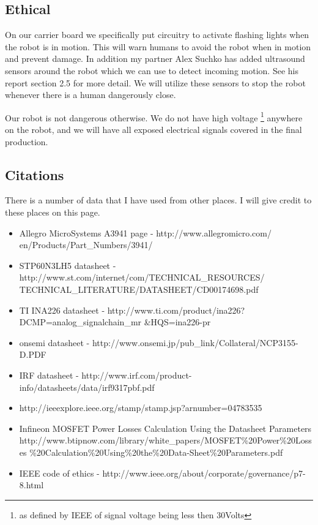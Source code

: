\documentclass[12pt]{article}
\begin{document}
\subsection{Ethical}
On our carrier board we specifically put circuitry to activate flashing lights when the robot is in motion. This will warn humans to avoid the robot when in motion and prevent damage. In addition my partner Alex Suchko has added ultrasound sensors around the robot which we can use to detect incoming motion. See his report section 2.5 for more detail. We will utilize these sensors to stop the robot whenever there is a human dangerously close.

Our robot is not dangerous otherwise. We do not have high voltage \footnote{as defined by IEEE of signal voltage being less then 30Volts} anywhere on the robot, and we will have all exposed electrical signals covered in the final production.
\subsection{Citations}
There is a number of data that I have used from other places. I will give credit to these places on this page.
\begin{itemize}
\item Allegro MicroSystems A3941 page - http://www.allegromicro.com/ en/Products/Part\_Numbers/3941/
\item STP60N3LH5 datasheet - http://www.st.com/internet/com/TECHNICAL\_RESOURCES/ TECHNICAL\_LITERATURE/DATASHEET/CD00174698.pdf
\item TI INA226 datasheet - http://www.ti.com/product/ina226?DCMP=analog\_signalchain\_mr \&HQS=ina226-pr
\item onsemi datasheet - http://www.onsemi.jp/pub\_link/Collateral/NCP3155-D.PDF
\item IRF datasheet - http://www.irf.com/product-info/datasheets/data/irf9317pbf.pdf
\item http://ieeexplore.ieee.org/stamp/stamp.jsp?arnumber=04783535
\item Infineon MOSFET Power Losses Calculation Using the Datasheet Parameters http://www.btipnow.com/library/white\_papers/MOSFET\%20Power\%20Losses \%20Calculation\%20Using\%20the\%20Data-Sheet\%20Parameters.pdf
\item IEEE code of ethics - http://www.ieee.org/about/corporate/governance/p7-8.html

\end{itemize}

 
\end{document}
